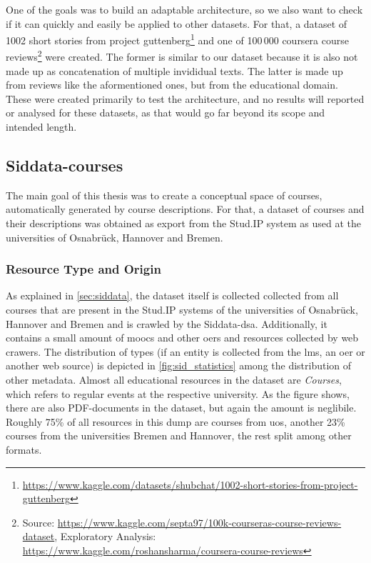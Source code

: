 One of the goals was to build an adaptable architecture, so we also want to check if it can quickly and easily be applied to other datasets. For that, a dataset of 1002 short stories from project guttenberg\footnote{\url{https://www.kaggle.com/datasets/shubchat/1002-short-stories-from-project-guttenberg}} and one of 100\,000 coursera course reviews\footnote{Source: \url{https://www.kaggle.com/septa97/100k-courseras-course-reviews-dataset}, Exploratory Analysis: \url{https://www.kaggle.com/roshansharma/coursera-course-reviews}} were created. The former is similar to our dataset because it is also not made up as concatenation of multiple invididual texts. The latter is made up from reviews like the aformentioned ones, but from the educational domain. These were created primarily to test the architecture, and no results will reported or analysed for these datasets, as that would go far beyond its scope and intended length.


\subsection{Siddata-courses}
\label{sec:dataset_siddata}




The main goal of this thesis was to create a conceptual space of courses, automatically generated by course descriptions. For that, a dataset of courses and their descriptions was obtained as export from the Stud.IP system as used at the universities of Osnabrück, Hannover and Bremen.

\subsubsection*{Resource Type and Origin}

As explained in \autoref{sec:siddata}, the dataset itself is collected collected from all courses that are present in the Stud.IP systems of the universities of Osnabrück, Hannover and Bremen and is crawled by the Siddata-\gls{dsa}. Additionally, it contains a small amount of \glspl{mooc} and other \glspl{oer} and resources collected by web crawers. The distribution of types (if an entity is collected from the \gls{lms}, an \gls{oer} or another web source) is depicted in \autoref{fig:sid_statistics} among the distribution of other metadata. Almost all educational resources in the dataset are \textit{Courses}, which refers to regular events at the respective university. As the figure shows, there are also PDF-documents in the dataset, but again the amount is neglibile. Roughly 75\% of all resources in this dump are courses from \gls{uos}, another 23\% courses from the universities Bremen and Hannover, the rest split among other formats. 

